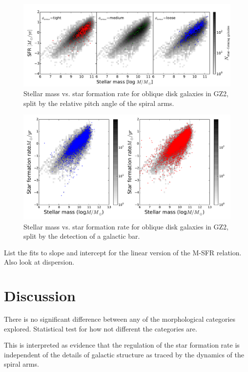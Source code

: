 \documentclass{emulateapj}
\begin{document}
\begin{figure}
\includegraphics[angle=0,width=7.0in]{ms_arms_winding.pdf}
\caption{Stellar mass vs. star formation rate for oblique disk galaxies in GZ2, split by the relative pitch angle of the spiral arms. 
\label{fig-winding}}
\end{figure}

\begin{figure}
\includegraphics[angle=0,width=7.0in]{ms_bar.pdf}
\caption{Stellar mass vs. star formation rate for oblique disk galaxies in GZ2, split by the detection of a galactic bar. 
\label{fig-bar}}
\end{figure}

List the fits to slope and intercept for the linear version of the M-SFR relation. Also look at dispersion. 


\section{Discussion}\label{sec-discussion}

There is no significant difference between any of the morphological categories explored. Statistical test for how not different the categories are. 

This is interpreted as evidence that the regulation of the star formation rate is independent of the details of galactic structure as traced by the dynamics of the spiral arms. 
\end{document}
